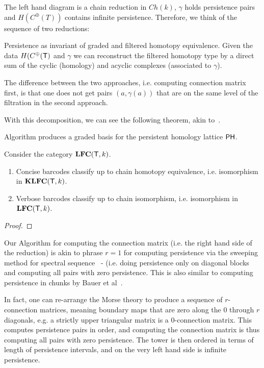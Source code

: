The left hand diagram is a chain reduction in $Ch(k)$, $\gamma$ holds persistence pairs and $H(C^\oplus(T))$ contains infinite persistence.   Therefore, we think of the sequence of two reductions:
 


Persistence as invariant of graded and filtered homotopy equivalence.  Given the data $H(C^\oplus({\mathsf T})$ and $\gamma$ we can reconstruct the filtered homotopy type by a direct sum of the cyclic (homology) and acyclic complexes (associated to $\gamma$).

The difference between the two approaches, i.e. computing connection matrix first, is that one does not get pairs $(a,\gamma(a))$ that are on the same level of the filtration in the second approach.

With this decomposition, we can see the following theorem, akin to~\cite{usher}.

\begin{thm}
Algorithm produces a graded basis for the persistent homology lattice $\mathsf{PH}$.
\end{thm}

\begin{thm}\label{thm:pers:inv}
Consider the category ${\bf LFC}({\mathsf T},k)$.  
\begin{enumerate}
\item Concise barcodes classify up to chain homotopy equivalence, i.e. isomorphism in ${\bf KLFC}({\mathsf T},k)$.

\item Verbose barcodes classify up to chain isomorphism, i.e. isomorphism in ${\bf LFC}({\mathsf T},k)$.
\end{enumerate}
\end{thm}
\begin{proof}


\end{proof}

\begin{rem}
Our Algorithm  for computing the connection matrix (i.e. the right hand side of the reduction) is akin to phrase $r=1$ for computing persistence via the sweeping method for spectral sequence~\cite{} - (i.e. doing persistence only on diagonal blocks and computing all pairs with zero persistence.  This is also similar to computing persistence in chunks by Bauer et al~\cite{}. 
\end{rem}

\begin{rem}
In fact, one can re-arrange the Morse theory to produce a sequence of $r$-connection matrices, meaning boundary maps that are zero along the $0$ through $r$ diagonals, e.g. a strictly upper triangular matrix is a $0$-connection matrix.  This computes persistence pairs in order, and computing the connection matrix is thus computing all pairs with zero persistence.  The tower is then ordered in terms of length of persistence intervals, and on the very left hand side is infinite persistence.
\end{rem}



